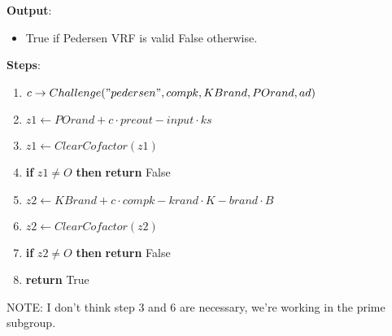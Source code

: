 \documentclass[
]{article}
\providecommand{\tightlist}{%
  \setlength{\itemsep}{0pt}\setlength{\parskip}{0pt}}
\begin{document}
\textbf{Output}:

\begin{itemize}
\tightlist
\item
  True if Pedersen VRF is valid False otherwise.
\end{itemize}

\textbf{Steps}:

\begin{enumerate}
\def\labelenumi{\arabic{enumi}.}
\tightlist
\item
  \(c \rightarrow Challenge("pedersen", compk, KBrand, POrand, ad)\)
\item
  \(z1 \leftarrow POrand + c \cdot preout - input \cdot ks\)
\item
  \(z1 \leftarrow ClearCofactor(z1)\)
\item
  \textbf{if} \(z1 \neq O\) \textbf{then} \textbf{return} False
\item
  \(z2 \leftarrow KBrand + c \cdot compk - krand \cdot K - brand \cdot B\)
\item
  \(z2 \leftarrow ClearCofactor(z2)\)
\item
  \textbf{if} \(z2 \neq O\) \textbf{then} \textbf{return} False
\item
  \textbf{return} True
\end{enumerate}

NOTE: I don't think step 3 and 6 are necessary, we're working in the
prime subgroup.
\end{document}

